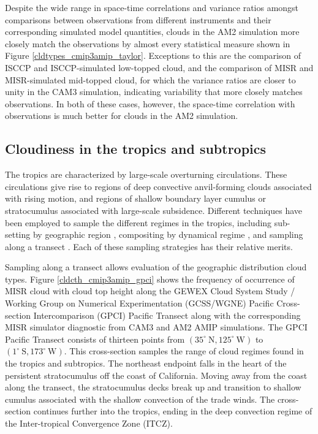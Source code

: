 Despite the wide range in space-time correlations and variance ratios amongst comparisons between observations from different instruments and their corresponding simulated model quantities, clouds in the AM2 simulation more closely match the observations by almost every statistical measure shown in Figure \ref{cldtypes_cmip3amip_taylor}. Exceptions to this are the comparison of ISCCP and ISCCP-simulated low-topped cloud, and the comparison of MISR and MISR-simulated mid-topped cloud, for which the variance ratios are closer to unity in the CAM3 simulation, indicating variability that more closely matches observations. In both of these cases, however, the space-time correlation with observations is much better for clouds in the AM2 simulation.

\subsection{Cloudiness in the tropics and subtropics}
The tropics are characterized by large-scale overturning circulations. These circulations give rise to regions of deep convective anvil-forming clouds associated with rising motion, and regions of shallow boundary layer cumulus or stratocumulus associated with large-scale subsidence. Different techniques have been employed to sample the different regimes in the tropics, including sub-setting by geographic region \citep[e.g.,][]{klein_and_hartmann_1993}, compositing by dynamical regime \citep[e.g.,][]{bony_et_al_2004,bony_and_dufresne_2005,medeiros_and_stevens_2009,medeiros_et_al_2011}, and sampling along a transect \citep[e.g.,][]{wyant_et_al_2010,bretherton_et_al_2010,teixeira_et_al_2011}. Each of these sampling strategies has their relative merits.

Sampling along a transect allows evaluation of the geographic distribution cloud types. Figure \ref{cldcth_cmip3amip_gpci} shows the frequency of occurrence of MISR cloud with cloud top height along the GEWEX Cloud System Study / Working Group on Numerical Experimentation (GCSS/WGNE) Pacific Cross-section Intercomparison (GPCI) Pacific Transect \citep{teixeira_et_al_2011} along with the corresponding MISR simulator diagnostic from CAM3 and AM2 AMIP simulations. The GPCI Pacific Transect \citep{teixeira_et_al_2011} consists of thirteen points from $(35^\circ~\text{N},125^\circ~\text{W})$ to $(1^\circ~\text{S},173^\circ~\text{W})$. This cross-section samples the range of cloud regimes found in the tropics and subtropics. The northeast endpoint falls in the heart of the persistent stratocumulus off the coast of California. Moving away from the coast along the transect, the stratocumulus decks break up and transition to shallow cumulus associated with the shallow convection of the trade winds. The cross-section continues further into the tropics, ending in the deep convection regime of the Inter-tropical Convergence Zone (ITCZ).

